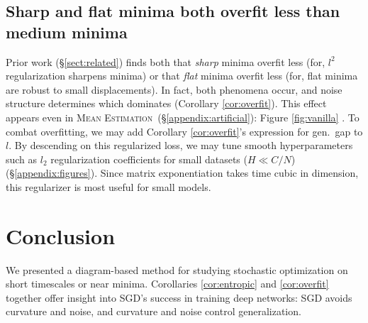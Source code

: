 \documentclass[final,12pt]{colt2021} %
\newcommand{\ofsix}[1]{
    {\tiny \raisebox{0.04cm}{$\substack{
        \ifthenelse{\equal{#1}{0}}{{\color{moor}\blacksquare}}{\square}
        \ifthenelse{\equal{#1}{2}}{{\color{moor}\blacksquare}}{\square}    
        \ifthenelse{\equal{#1}{4}}{{\color{moor}\blacksquare}}{\square} \\
        \ifthenelse{\equal{#1}{1}}{{\color{moor}\blacksquare}}{\square}    
        \ifthenelse{\equal{#1}{3}}{{\color{moor}\blacksquare}}{\square}
        \ifthenelse{\equal{#1}{5}}{{\color{moor}\blacksquare}}{\square}
    }$}}%
}
\newcommand{\MeanEstimation}{\textsc{Mean Estimation}}
\begin{document}
    
    
        \subsection{Sharp and flat minima both overfit less than medium minima} \label{subsect:overfit}
    
            Prior work (\S\ref{sect:related}) finds both that \emph{sharp} minima
            overfit less (for, $l^2$ regularization sharpens minima) or that
            \emph{flat} minima overfit less (for, flat minima are robust to small
            displacements).  In fact, both phenomena occur, and noise structure
            determines which dominates (Corollary \ref{cor:overfit}).  This effect
            appears even in \MeanEstimation\, (\S\ref{appendix:artificial}): Figure
            \ref{fig:vanilla}\ofsix{5}.
            To combat overfitting, we may add Corollary \ref{cor:overfit}'s
            expression for gen.\ gap to $l$.  By descending on this regularized
            loss, we may tune smooth hyperparameters such as $l_2$ regularization
            coefficients for small datasets ($H \ll C/N$)
            (\S\ref{appendix:figures}).  Since matrix exponentiation takes time
            cubic in dimension, this regularizer is most useful for small models.



    \section{Conclusion}
    
    
        We presented a diagram-based method for studying stochastic optimization on
        short timescales or near minima.
            Corollaries \ref{cor:entropic} and \ref{cor:overfit} together offer
            insight into SGD's success in training deep networks: SGD avoids
            curvature and noise, and curvature and noise control generalization.
    
\end{document}
